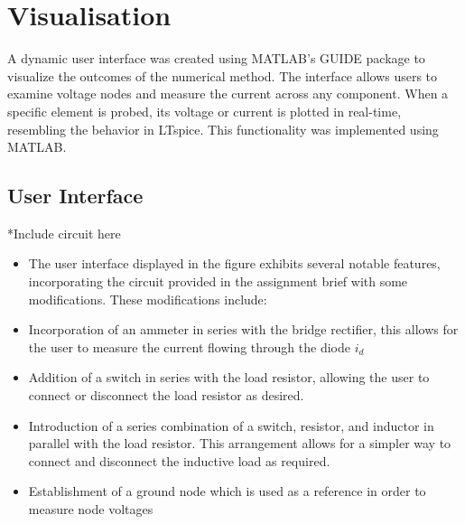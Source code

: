 \section{Visualisation}
A dynamic user interface was created using MATLAB's GUIDE package to visualize the outcomes of the numerical method. The interface allows users to examine voltage nodes and measure the current across any component. When a specific element is probed, its voltage or current is plotted in real-time, resembling the behavior in LTspice. This functionality was implemented using MATLAB.

\subsection{User Interface}

*Include circuit  here


\begin{itemize}
    \item The user interface displayed in the figure exhibits several notable features, incorporating the circuit provided in the assignment brief with some modifications. These modifications include:
\end{itemize}

\begin{itemize}
    \item Incorporation of an ammeter in series with the bridge rectifier, this allows for the user to measure the current flowing through the diode $i_d$
\end{itemize}

\begin{itemize}
    \item Addition of a switch in series with the load resistor, allowing the user to connect or disconnect the load resistor as desired.
\end{itemize}

\begin{itemize}
    \item Introduction of a series combination of a switch, resistor, and inductor in parallel with the load resistor. This arrangement allows for a simpler way to connect and disconnect the inductive load as required.
\end{itemize}

\begin{itemize}
    \item Establishment of a ground node which is used as a reference in order to measure node voltages
\end{itemize}

